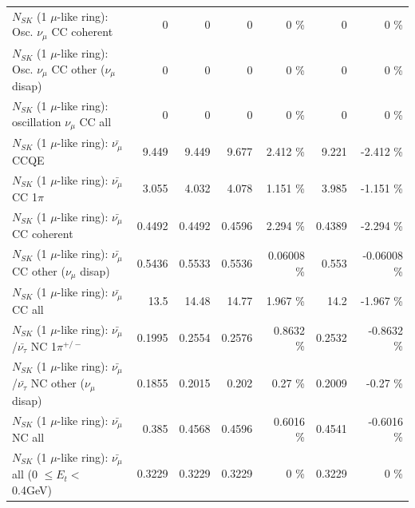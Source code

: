 \begin{table}
\begin{tabular}{| l | r | r | r  r | r  r |}
                        $N_{SK}$ (1 $\mu$-like ring): Osc. $\nu_\mu$ CC coherent &               0 &               0 &               0 &        0 \%  &               0 &        0 \%  \\ 
         $N_{SK}$ (1 $\mu$-like ring): Osc. $\nu_\mu$ CC other ($\nu_\mu$ disap) &               0 &               0 &               0 &        0 \%  &               0 &        0 \%  \\ 
                      $N_{SK}$ (1 $\mu$-like ring): oscillation $\nu_\mu$ CC all &               0 &               0 &               0 &        0 \%  &               0 &        0 \%  \\ 
\hline
\hline
                              $N_{SK}$ (1 $\mu$-like ring): $\bar{\nu_\mu}$ CCQE &           9.449 &           9.449 &           9.677 &    2.412 \%  &           9.221 &   -2.412 \%  \\ 
                         $N_{SK}$ (1 $\mu$-like ring): $\bar{\nu_\mu}$ CC 1$\pi$ &           3.055 &           4.032 &           4.078 &    1.151 \%  &           3.985 &   -1.151 \%  \\ 
                       $N_{SK}$ (1 $\mu$-like ring): $\bar{\nu_\mu}$ CC coherent &          0.4492 &          0.4492 &          0.4596 &    2.294 \%  &          0.4389 &   -2.294 \%  \\ 
        $N_{SK}$ (1 $\mu$-like ring): $\bar{\nu_\mu}$ CC other ($\nu_\mu$ disap) &          0.5436 &          0.5533 &          0.5536 &  0.06008 \%  &           0.553 & -0.06008 \%  \\ 
                          $N_{SK}$ (1 $\mu$-like ring): $\bar{\nu_{\mu}}$ CC all &            13.5 &           14.48 &           14.77 &    1.967 \%  &            14.2 &   -1.967 \%  \\ 
\hline
  $N_{SK}$ (1 $\mu$-like ring): $\bar{\nu_\mu}$/$\bar{\nu_\tau}$ NC 1$\pi^{+/-}$ &          0.1995 &          0.2554 &          0.2576 &   0.8632 \%  &          0.2532 &  -0.8632 \%  \\ 
$N_{SK}$ (1 $\mu$-like ring): $\bar{\nu_\mu}$/$\bar{\nu_\tau}$ NC other ($\nu_\mu$ disap) &          0.1855 &          0.2015 &           0.202 &     0.27 \%  &          0.2009 &    -0.27 \%  \\ 
                          $N_{SK}$ (1 $\mu$-like ring): $\bar{\nu_{\mu}}$ NC all &           0.385 &          0.4568 &          0.4596 &   0.6016 \%  &          0.4541 &  -0.6016 \%  \\ 
\hline
   $N_{SK}$ (1 $\mu$-like ring): $\bar{\nu_{\mu}}$ all (0 $\leq E_{t} <$ 0.4GeV) &          0.3229 &          0.3229 &          0.3229 &        0 \%  &          0.3229 &        0 \%  \\ 

\end{tabular}
\end{table}
